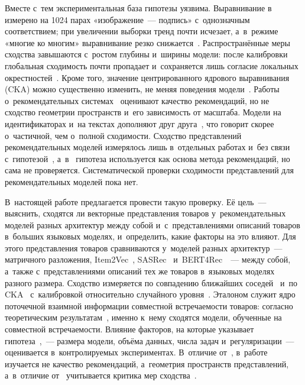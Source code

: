 \documentclass[a4paper,12pt]{article}
\begin{document}
Вместе с~тем экспериментальная база гипотезы уязвима. Выравнивание
в~\cite{huh2024platonic} измерено на 1024 парах «изображение~--- подпись»
с~однозначным соответствием; при увеличении выборки тренд почти исчезает,
а~в~режиме «многие ко многим» выравнивание резко снижается~\cite{koepke2026cave}.
Распространённые меры сходства завышаются с~ростом глубины и~ширины модели: после
калибровки глобальная сходимость почти пропадает и~сохраняется лишь согласие
локальных окрестностей~\cite{groger2026aristotelian}. Кроме того, значение
центрированного ядрового выравнивания (CKA) можно существенно изменить, не меняя
поведения модели~\cite{davari2023cka}. Работы о~рекомендательных
системах~\cite{hou2022unisrec,li2023recformer,yuan2023idvsmodality,sheng2025alpharec}
оценивают качество рекомендаций, но не сходство геометрии пространств и~его
зависимость от масштаба. Модели на идентификаторах и~на текстах дополняют друг
друга~\cite{collins2025complementarity}, что говорит скорее о~частичной, чем о~полной
сходимости. Сходство представлений рекомендательных моделей измерялось лишь
в~отдельных работах и~без связи с~гипотезой~\cite{iana2024peeling},
а~в~\cite{lin2024dreamumm} гипотеза используется как основа метода рекомендаций,
но сама не проверяется. Систематической проверки сходимости представлений для
рекомендательных моделей пока нет.

В~настоящей работе предлагается провести такую проверку. Её цель~--- выяснить,
сходятся ли векторные представления товаров у~рекомендательных моделей разных
архитектур между собой и~с~представлениями описаний товаров в~больших языковых
моделях, и~определить, какие факторы на это влияют. Для этого представления товаров
сравниваются у~моделей разных архитектур~--- матричного разложения,
Item2Vec~\cite{barkan2016item2vec}, SASRec~\cite{kang2018sasrec}
и~BERT4Rec~\cite{sun2019bert4rec}~--- между собой, а~также с~представлениями описаний
тех же товаров в~языковых моделях разного размера. Сходство измеряется по совпадению
ближайших соседей~\cite{huh2024platonic} и~по CKA~\cite{kornblith2019cka} с~калибровкой
относительно случайного уровня~\cite{groger2026aristotelian}. Эталоном служит ядро
поточечной взаимной информации совместной встречаемости товаров: согласно теоретическим
результатам~\cite{huh2024platonic,oord2018cpc,levy2014implicit}, именно к~нему сходятся
модели, обученные на совместной встречаемости. Влияние факторов, на которые указывает
гипотеза~\cite{huh2024platonic},~--- размера модели, объёма данных, числа задач
и~регуляризации~--- оценивается в~контролируемых экспериментах. В~отличие
от~\cite{sheng2025alpharec}, в~работе изучается не качество рекомендаций, а~геометрия
пространств представлений, а~в~отличие от~\cite{huh2024platonic} учитывается критика
мер сходства~\cite{koepke2026cave,groger2026aristotelian}.
\end{document}

